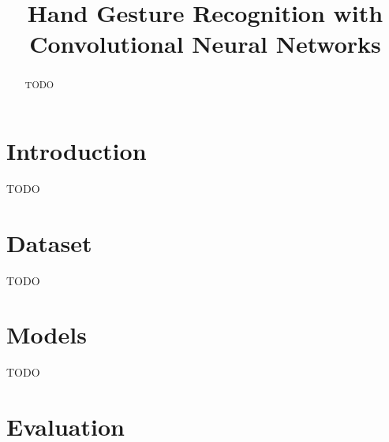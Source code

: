 \documentclass[a4paper]{article}
\title{Hand Gesture Recognition with Convolutional Neural Networks}
\begin{document}
\maketitle
%
\begin{abstract}
TODO
\end{abstract}

\section{Introduction}
TODO

\section{Dataset}
TODO

\section{Models}
TODO

\section{Evaluation}
\end{document}
